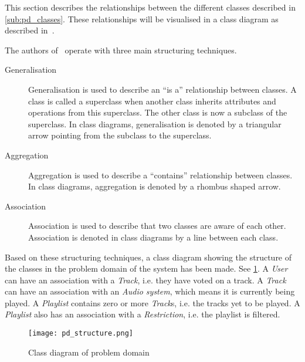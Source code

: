 This section describes the relationships between the different classes
described in \cref{sub:pd_classes}. These relationships will be
visualised in a class diagram as described
in~\cite{mathiassen2001objektorienteret}.

The authors of~\cite{mathiassen2001objektorienteret} operate with three
main structuring techniques.

\begin{description}
\item[Generalisation] Generalisation is used to describe an \enquote{is a}
  relationship between classes. A class is called a
  superclass when another class inherits attributes and operations
  from this superclass. The other class is now a subclass of the
  superclass. In class diagrams, generalisation is denoted by a
  triangular arrow pointing from the subclass to the superclass.
\item[Aggregation] Aggregation is used to describe a
  \enquote{contains} relationship between classes. In class diagrams,
  aggregation is denoted by a rhombus shaped arrow.
\item[Association] Association is used to describe that two classes
  are aware of each other. Association is denoted in class diagrams by
  a line between each class.
\end{description} 


Based on these structuring techniques, a class diagram showing the structure of the classes in the problem domain of the system has been made. See \cref{fig:pd_structure}. A \textit{User} can have an association with a \textit{Track}, i.e. they have voted on a track. A \textit{Track} can have an association with an \textit{Audio system}, which means it is currently being played. A \textit{Playlist} contains zero or more \textit{Track}s, i.e. the tracks yet to be played. A \textit{Playlist} also has an association with a \textit{Restriction}, i.e. the playlist is filtered.

\begin{figure}
  \centering
  \texttt{[image: pd\_structure.png]}
  \caption{Class diagram of problem domain}\label{fig:pd_structure}
\end{figure}
